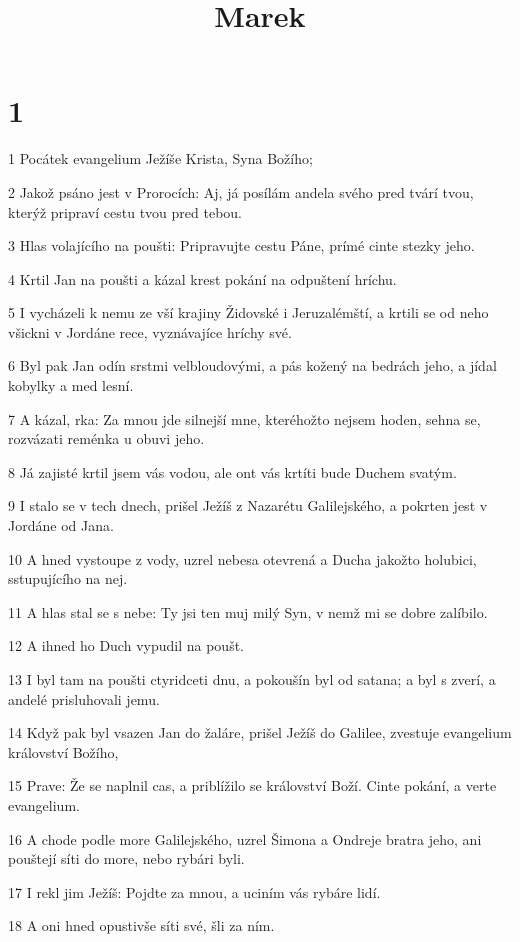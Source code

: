 

\title{Marek}

\chapter{1}

\par 1 Pocátek evangelium Ježíše Krista, Syna Božího;
\par 2 Jakož psáno jest v Prorocích: Aj, já posílám andela svého pred tvárí tvou, kterýž pripraví cestu tvou pred tebou.
\par 3 Hlas volajícího na poušti: Pripravujte cestu Páne, prímé cinte stezky jeho.
\par 4 Krtil Jan na poušti a kázal krest pokání na odpuštení hríchu.
\par 5 I vycházeli k nemu ze vší krajiny Židovské i Jeruzalémští, a krtili se od neho všickni v Jordáne rece, vyznávajíce hríchy své.
\par 6 Byl pak Jan odín srstmi velbloudovými, a pás kožený na bedrách jeho, a jídal kobylky a med lesní.
\par 7 A kázal, rka: Za mnou jde silnejší mne, kteréhožto nejsem hoden, sehna se, rozvázati reménka u obuvi jeho.
\par 8 Já zajisté krtil jsem vás vodou, ale ont vás krtíti bude Duchem svatým.
\par 9 I stalo se v tech dnech, prišel Ježíš z Nazarétu Galilejského, a pokrten jest v Jordáne od Jana.
\par 10 A hned vystoupe z vody, uzrel nebesa otevrená a Ducha jakožto holubici, sstupujícího na nej.
\par 11 A hlas stal se s nebe: Ty jsi ten muj milý Syn, v nemž mi se dobre zalíbilo.
\par 12 A ihned ho Duch vypudil na poušt.
\par 13 I byl tam na poušti ctyridceti dnu, a pokoušín byl od satana; a byl s zverí, a andelé prisluhovali jemu.
\par 14 Když pak byl vsazen Jan do žaláre, prišel Ježíš do Galilee, zvestuje evangelium království Božího,
\par 15 Prave: Že se naplnil cas, a priblížilo se království Boží. Cinte pokání, a verte evangelium.
\par 16 A chode podle more Galilejského, uzrel Šimona a Ondreje bratra jeho, ani pouštejí síti do more, nebo rybári byli.
\par 17 I rekl jim Ježíš: Pojdte za mnou, a uciním vás rybáre lidí.
\par 18 A oni hned opustivše síti své, šli za ním.
